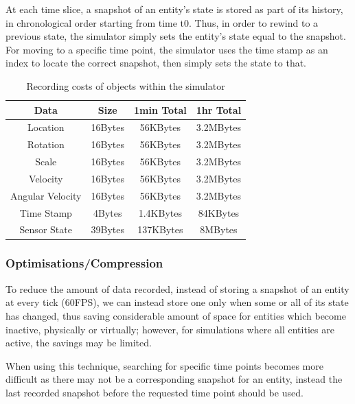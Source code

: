 At each time slice, a snapshot of an entity's state is stored as part of its history, in chronological order starting from time t0. Thus, in order to rewind to a previous state, the simulator simply sets the entity's state equal to the snapshot. For moving to a specific time point, the simulator uses the time stamp as an index to locate the correct snapshot, then simply sets the state to that.
\begin{table}
	\centering
	\caption{Recording costs of objects within the simulator}
	\begin{tabular}{|c|c|c|c|}
	\hline
	Data & Size & 1min Total & 1hr Total\\\hline
	Location & 16Bytes & 56KBytes & 3.2MBytes\\\hline
	Rotation & 16Bytes & 56KBytes & 3.2MBytes\\\hline
	Scale & 16Bytes & 56KBytes & 3.2MBytes\\\hline
	Velocity & 16Bytes & 56KBytes & 3.2MBytes\\\hline
	Angular Velocity & 16Bytes & 56KBytes & 3.2MBytes\\\hline
	Time Stamp & 4Bytes & 1.4KBytes & 84KBytes\\\hline
	Sensor State & 39Bytes & 137KBytes & 8MBytes\\\hline

	\end{tabular}
	\label{tab:recording_costs}
\end{table}

\subsubsection{Optimisations/Compression} %
\label{sub:compressed}
To reduce the amount of data recorded, instead of storing a snapshot of an entity at every tick (60FPS), we can instead store one only when some or all of its state has changed, thus saving considerable amount of space for entities which become inactive, physically or virtually; however, for simulations where all entities are active, the savings may be limited. 

When using this technique, searching for specific time points becomes more difficult as there may not be a corresponding snapshot for an entity, instead the last recorded snapshot before the requested time point should be used.

